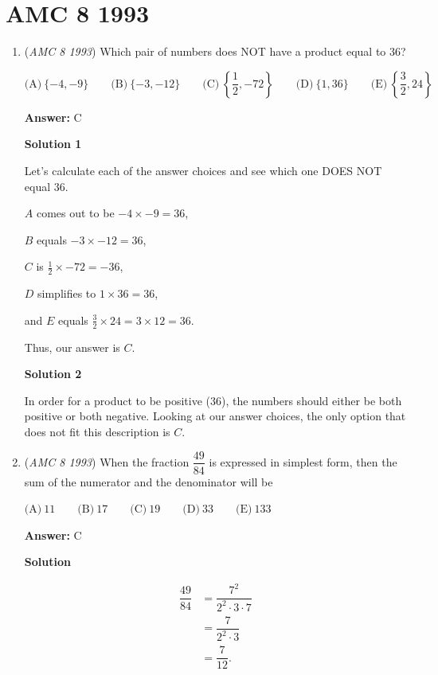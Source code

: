 \section{AMC 8 1993}
        \begin{enumerate}
        	\item (\textit{AMC 8 1993}) Which pair of numbers does NOT have a product equal to $36$?


 $\text{(A)}\ \{ -4,-9\} \qquad \text{(B)}\ \{ -3,-12\} \qquad \text{(C)}\ \left\{ \dfrac{1}{2},-72\right\} \qquad \text{(D)}\ \{ 1,36\} \qquad \text{(E)}\ \left\{\dfrac{3}{2},24\right\}$

 \textbf{Answer: }C



\textbf{Solution 1}

Let's calculate each of the answer choices and see which one DOES NOT equal $36$.

 $A$ comes out to be $-4 \times -9= 36$,

 $B$ equals $-3 \times -12= 36$,

 $C$ is $\frac{1}{2} \times -72= -36$,

 $D$ simplifies to $1 \times 36= 36$,

 and $E$ equals $\frac{3}{2} \times 24= 3 \times 12= 36$.

 Thus, our answer is $\boxed{C}$.

 



\textbf{Solution 2}

In order for a product to be positive ($36$), the numbers should either be both positive or both negative. Looking at our answer choices, the only option that does not fit this description is $\boxed{C}$.

 


	\item (\textit{AMC 8 1993}) When the fraction $\dfrac{49}{84}$ is expressed in simplest form, then the sum of the numerator and the denominator will be 


 $\text{(A)}\ 11 \qquad \text{(B)}\ 17 \qquad \text{(C)}\ 19 \qquad \text{(D)}\ 33 \qquad \text{(E)}\ 133$

 \textbf{Answer: }C



\textbf{Solution}


 \begin{align*} \dfrac{49}{84} &= \dfrac{7^2}{2^2\cdot 3\cdot 7} \\ &= \dfrac{7}{2^2\cdot 3} \\ &= \dfrac{7}{12}. \end{align*}



\end{enumerate}
